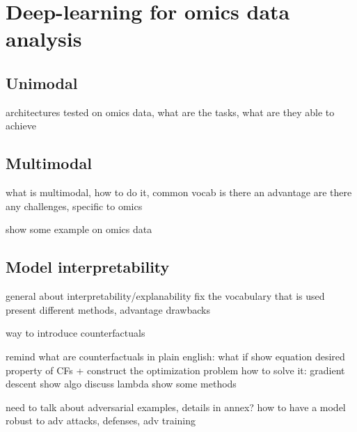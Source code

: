 \documentclass[../main.tex]{subfiles}
\begin{document}
\chapter{Deep-learning for omics data analysis}\label{chap:sota}
\minitocpage

\section{Unimodal}
architectures tested on omics data, what are the tasks, what are they able to achieve

\section{Multimodal}
what is multimodal, how to do it, common vocab
is there an advantage
are there any challenges, specific to omics

show some example on omics data

\section{Model interpretability}
general about interpretability/explanability
fix the vocabulary that is used
present different methods, advantage drawbacks

way to introduce counterfactuals

remind what are counterfactuals in plain english: what if
show equation
desired property of CFs + construct the optimization problem
how to solve it: gradient descent show algo
discuss lambda
show some methods

need to talk about adversarial examples, details in annex?
how to have a model robust to adv attacks, defenses, adv training
\end{document}
